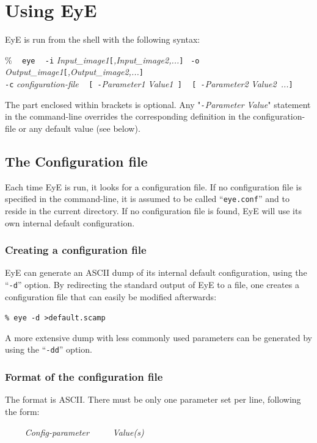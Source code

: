 \documentclass[11pt,titlepage]{article}
\begin{document}
\section{Using {\sc EyE}}
\label{using}
{\sc EyE} is run from the shell with the following syntax:

\% ~ {\tt eye} ~ {\tt -i} {\em Input\_image1}{\tt [}{\em ,Input\_image2,...}{\tt ]}~ {\tt -o} {\em Output\_image1}{\tt [}{\em ,Output\_image2,...}{\tt ]} \\
{\tt -c} {\em configuration-file} ~ {\tt [ -}{\em Parameter1} {\em Value1\ }{\tt ]} ~ {\tt [ -}{\em Parameter2} {\em Value2\ ...}{\tt ]}

The part enclosed within brackets is optional. Any "{\tt -}{\em Parameter} {\em Value}"
statement in the command-line overrides the corresponding definition in the configuration-file
or any default value (see below).

\subsection{The Configuration file}
\label{config}
Each time {\sc EyE} is run, it looks for a configuration file. If no configuration file is specified in the command-line,
it is assumed to be called ``{\tt eye.conf}'' and to reside in the current directory. If no configuration file is found, {\sc EyE} will use its own
internal default configuration.

\subsubsection{Creating a configuration file}
{\sc EyE} can generate an ASCII dump of its internal default
configuration, using the ``{\tt -d}'' option. By redirecting the standard
output of {\sc EyE} to a file, one creates a configuration file that
can easily be modified afterwards:

{\tt \% eye -d >default.scamp}

A more extensive dump with less commonly used parameters can be generated by
using the ``{\tt -dd}'' option.

\subsubsection{Format of the configuration file}
The format is ASCII. There must be only one parameter set per line,
following the form:

~~~~ {\em Config-parameter ~~~~ Value(s)}
\end{document}
